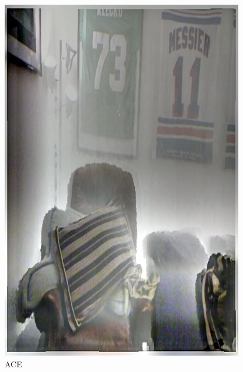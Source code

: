 \documentclass[12pt]{article}
\begin{document}
\begin{figure}[!h]
\begin{minipage}[t]{0.24\linewidth}
        \includegraphics[width=0.9\linewidth]{sample_pictures/after_DHAZY_ACE.jpg}
        \caption*{ACE}
    \end{minipage}\begin{minipage}[t]{0.24\linewidth}
        \centering

\end{minipage}
\end{figure}
\end{document}
